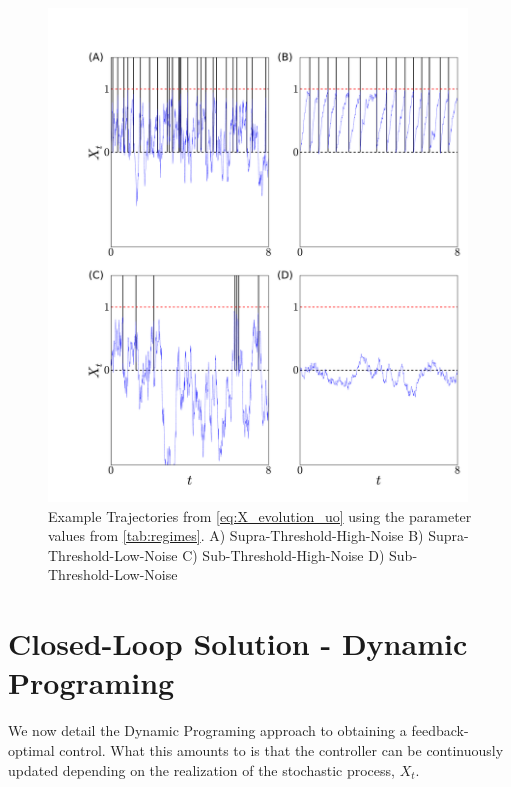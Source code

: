 \documentclass[12pt]{iopart}
\begin{document}
\begin{figure}[htp]
\begin{center}
  \includegraphics[width=0.99\textwidth]{Figs/PathSimulator/path_T=14_combined.pdf}
  \caption[labelInTOC]{Example Trajectories from \cref{eq:X_evolution_uo}
  using the parameter values from \cref{tab:regimes}. A)
  Supra-Threshold-High-Noise B) Supra-Threshold-Low-Noise C) Sub-Threshold-High-Noise D) Sub-Threshold-Low-Noise}
  \label{fig:regime_path_examples}
\end{center}
\end{figure}

\section{Closed-Loop Solution - Dynamic Programing}
We now detail the Dynamic Programing approach to obtaining a feedback-optimal
control. What this amounts to is that the controller can be continuously updated
depending on the realization of the stochastic process, $X_t$.
\end{document}
